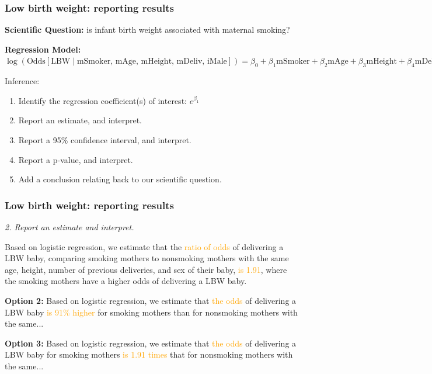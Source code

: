 \documentclass[12pt, 
hyperref={colorlinks=true, linkcolor=blue, urlcolor=cyan}]{beamer}
\begin{document}
\begin{frame}[noframenumbering]
\frametitle{Low birth weight: reporting results}
\textbf{Scientific Question:} is infant birth weight associated with maternal smoking? 

\textbf{Regression Model:}
$\log \left(\text{Odds}[ \text{LBW} \mid \text{mSmoker, mAge, mHeight, mDeliv, iMale}]\right) = \beta_0 + \beta_1 \text{mSmoker} + \beta_2 \text{mAge} + \beta_3 \text{mHeight} + \beta_4 \text{mDeliv} + \beta_5 \text{iMale}$

\color{blue} Inference: \color{black}
\begin{enumerate}
\item Identify the regression coefficient(s) of interest: \color{blue} $e^{\beta_1}$ \color{black}
\item Report an estimate, and interpret.
\item Report a 95\% confidence interval, and interpret.
\item Report a p-value, and interpret. 
\item Add a conclusion relating back to our scientific question.
\end{enumerate}
\end{frame}


\begin{frame}
\frametitle{Low birth weight: reporting results}
\textit{2. Report an estimate and interpret.}

Based on logistic regression, we estimate that the \textcolor{orange}{ratio of odds} of delivering a LBW baby, comparing smoking mothers to nonsmoking mothers with the same age, height, number of previous deliveries, and sex of their baby, \textcolor{orange}{is  1.91}, where the smoking mothers have a higher odds of delivering a LBW baby. \pause

\textbf{Option 2:} Based on logistic regression, we estimate that \textcolor{orange}{the odds} of delivering a LBW baby \textcolor{orange}{is 91\% higher} for smoking mothers than for nonsmoking mothers with the same... \pause

\textbf{Option 3:} Based on logistic regression, we estimate that \textcolor{orange}{the odds} of delivering a LBW baby for smoking mothers \textcolor{orange}{is 1.91 times} that for nonsmoking mothers with the same...

\end{frame}
\end{document}
